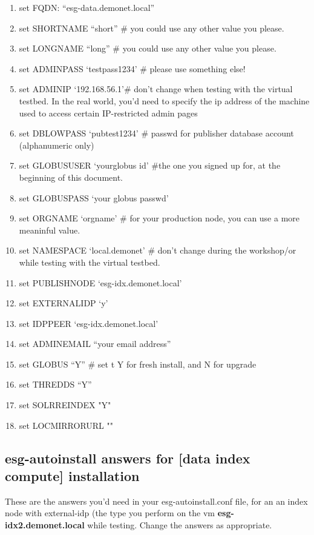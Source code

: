 \begin{enumerate}
\def\labelenumi{\arabic{enumi}.}
\item
  set FQDN: ``esg-data.demonet.local''
\item
  set SHORTNAME ``short'' \# you could use any other value you please.
\item
  set LONGNAME ``long'' \# you could use any other value you please.
\item
  set ADMINPASS `testpass1234' \# please use something else!
\item
  set ADMINIP `192.168.56.1'\# don't change when testing with the virtual testbed. In the real world, you'd need to specify the ip address of the machine used to access certain IP-restricted admin pages
\item
  set DBLOWPASS `pubtest1234' \# passwd for publisher database account
  (alphanumeric only)
\item
  set GLOBUSUSER `yourglobus id' \#the one you signed up for, at the
  beginning of this document.
\item
  set GLOBUSPASS `your globus passwd'
\item
  set ORGNAME `orgname' \# for your production node, you can use a more
  meaninful value.
\item
  set NAMESPACE `local.demonet' \# don't change during the workshop/or while testing with the virtual testbed.
\item
  set PUBLISHNODE `esg-idx.demonet.local'
\item
  set EXTERNALIDP `y'
\item
  set IDPPEER `esg-idx.demonet.local'
\item
  set ADMINEMAIL ``your email address''
\item
  set GLOBUS ``Y'' \# set t Y for fresh install, and N for upgrade
\item
  set THREDDS ``Y''
\item 
  set SOLRREINDEX "Y"
\item 
  set LOCMIRRORURL ""
\end{enumerate}

\subsection{esg-autoinstall answers for [data index compute] installation}

These are the answers you'd need in your esg-autoinstall.conf file, for an an index node with external-idp (the type you perform on the vm \textbf{esg-idx2.demonet.local} while testing.
Change the answers as appropriate.

